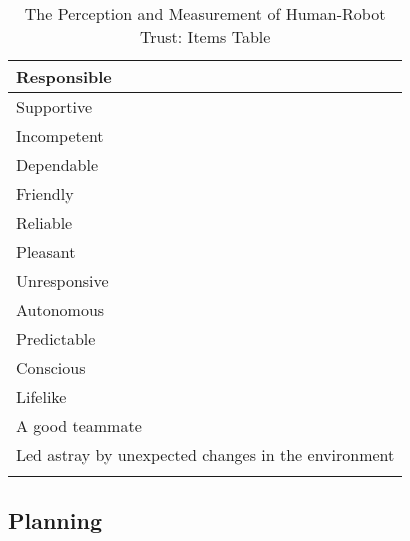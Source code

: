 \begin{longtable}{l}
	Responsible \\ \hline
	Supportive \\ \hline
	Incompetent \\ \hline
	Dependable \\ \hline
	Friendly \\ \hline
	Reliable \\ \hline
	Pleasant \\ \hline
	Unresponsive \\ \hline
	Autonomous \\ \hline
	Predictable \\ \hline
	Conscious \\ \hline
	Lifelike \\ \hline
	A good teammate \\ \hline
	Led astray by unexpected changes in the environment \\
	\caption{The Perception and Measurement of Human-Robot Trust: Items Table}
	\label{tbl:measurement.items.table}	
\end{longtable}

\newpage
\begin{landscape}
	\section{Planning}
	\label{app:Planning}	
	\begin{figure}        
		\centering 
	\end{figure}
\end{landscape}


